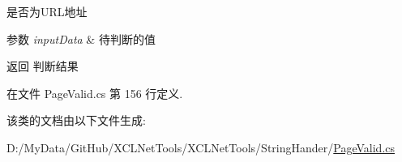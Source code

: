 是否为\+U\+R\+L地址 


\begin{DoxyParams}{参数}
{\em input\+Data} & 待判断的值\\
\hline
\end{DoxyParams}
\begin{DoxyReturn}{返回}
判断结果
\end{DoxyReturn}


在文件 Page\+Valid.\+cs 第 156 行定义.



该类的文档由以下文件生成\+:\begin{DoxyCompactItemize}
\item 
D\+:/\+My\+Data/\+Git\+Hub/\+X\+C\+L\+Net\+Tools/\+X\+C\+L\+Net\+Tools/\+String\+Hander/\hyperlink{_page_valid_8cs}{Page\+Valid.\+cs}\end{DoxyCompactItemize}
